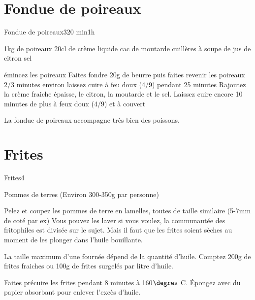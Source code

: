 {\section{Fondue de poireaux}
\begin{recette}{Fondue de poireaux}{3}{20 min}{1h}
\begin{ingredients}[3 personnes]
\ingredient 1kg de poireaux
\ingredient 20cl de crème liquide
 cac de moutarde
 cuillères à soupe de jus de citron
\ingredient sel
\end{ingredients}

\begin{preparation}
\etape émincez les poireaux
\etape Faites fondre 20g de beurre puis faites revenir les poireaux 2/3 minutes environ
\etape laissez cuire à feu doux (4/9) pendant 25 minutes
\etape Rajoutez la crème fraiche épaisse, le citron, la moutarde et le sel.
\etape Laissez cuire encore 10 minutes de plus à feux doux (4/9) et à couvert
\begin{remarque}
La fondue de poireaux accompagne très bien des poissons.
\end{remarque}
\end{preparation}
\end{recette}

\section{Frites}
\begin{recette}{Frites}{4}{}{}
\begin{ingredients}
\ingredient Pommes de terres (Environ 300-350g par personne)
\end{ingredients}

\begin{preparation}
\etape Pelez et coupez les pommes de terre en lamelles, toutes de taille similaire (5-7mm de coté par ex)
\etape Vous pouvez les laver si vous voulez, la communautée des fritophiles est divisée sur le sujet. Mais il faut que les frites soient sèches au moment de les plonger dans l'huile bouillante.
\end{preparation}

\begin{cuisson}
La taille maximum d'une fournée dépend de la quantité d'huile. Comptez 200g de frites fraiches ou 100g de frites surgelés par litre d'huile. 

Faites précuire les frites pendant 8 minutes à 160$\degres$ C. Épongez avec du papier absorbant pour enlever l'excès d'huile. 


\end{cuisson}
\end{recette}}
